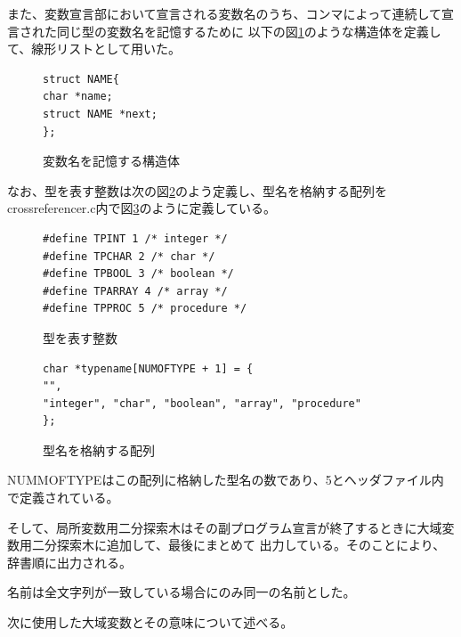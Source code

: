 \documentclass{jarticle}
\begin{document}
また、変数宣言部において宣言される変数名のうち、コンマによって連続して宣言された同じ型の変数名を記憶するために
以下の図\ref{code:name}のような構造体を定義して、線形リストとして用いた。
\begin{figure}
\begin{center}
\begin{lstlisting}
struct NAME{
char *name;
struct NAME *next;
};
\end{lstlisting}
\caption{変数名を記憶する構造体}
\label{code:name}
\end{center}
\end{figure}

なお、型を表す整数は次の図\ref{code:kata}のよう定義し、型名を格納する配列をcrossreferencer.c内で図\ref{code:katahairetu}のように定義している。
\begin{figure}[H]
\begin{center}
\begin{lstlisting}
#define TPINT 1 /* integer */
#define TPCHAR 2 /* char */
#define TPBOOL 3 /* boolean */
#define TPARRAY 4 /* array */
#define TPPROC 5 /* procedure */
\end{lstlisting}
\caption{型を表す整数}
\label{code:kata}
\end{center}
\end{figure}
\begin{figure}[H]
\begin{center}
\begin{lstlisting}
char *typename[NUMOFTYPE + 1] = {
"",
"integer", "char", "boolean", "array", "procedure"
};
\end{lstlisting}
\caption{型名を格納する配列}
\label{code:katahairetu}
\end{center}
\end{figure}
NUMMOFTYPEはこの配列に格納した型名の数であり、5とヘッダファイル内で定義されている。

そして、局所変数用二分探索木はその副プログラム宣言が終了するときに大域変数用二分探索木に追加して、最後にまとめて
出力している。そのことにより、辞書順に出力される。

名前は全文字列が一致している場合にのみ同一の名前とした。

次に使用した大域変数とその意味について述べる。
\end{document}
